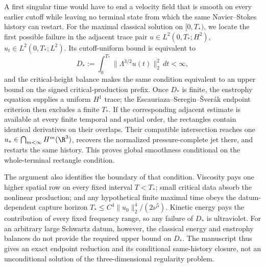 
A first singular time would have to end a velocity field that is smooth on
every earlier cutoff while leaving no terminal state from which the same
Navier--Stokes history can restart.  For the maximal classical solution on
\([0,T_*)\), we locate the first possible failure in the adjacent trace pair
\(u\in L^2(0,T_*;H^2)\),
\(u_t\in L^2(0,T_*;L^2)\).  Its cutoff-uniform bound is equivalent to
\[
  D_*:=\int_0^{T_*}\|\Lambda^{3/2}u(t)\|_2^2\,dt<\infty,
\]
and the critical-height balance makes the same condition equivalent to an
upper bound on the signed critical-production prefix.  Once \(D_*\) is finite,
the enstrophy equation supplies a uniform \(H^1\) trace; the
Escauriaza--Seregin--\v{S}ver\'ak endpoint criterion then excludes a finite
\(T_*\).  If the corresponding adjacent estimate is available at every finite
temporal and spatial order, the rectangles contain identical derivatives on
their overlaps.  Their compatible intersection reaches one
\(u_*\in\bigcap_{m<\infty}H^m(\R^3)\), recovers the normalized pressure-complete
jet there, and restarts the same history.  This proves global smoothness
conditional on the whole-terminal rectangle condition.

The argument also identifies the boundary of that condition.  Viscosity pays
one higher spatial row on every fixed interval \(T<T_*\); small critical data
absorb the nonlinear production; and any hypothetical finite maximal time
obeys the datum-dependent capture horizon
\(T_*\leq C^4\|u_0\|_2^4/(2\nu^5)\).  Kinetic energy pays the contribution of
every fixed frequency range, so any failure of \(D_*\) is ultraviolet.  For an
arbitrary large Schwartz datum, however, the classical energy and enstrophy
balances do not provide the required upper bound on \(D_*\).  The manuscript
thus gives an exact endpoint reduction and its conditional same-history
closure, not an unconditional solution of the three-dimensional regularity
problem.
